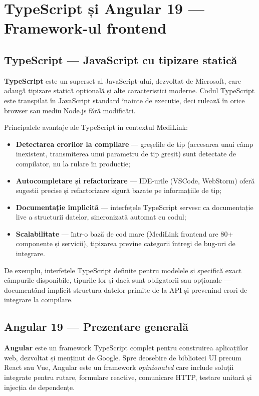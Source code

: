 \section{TypeScript și Angular 19 --- Framework-ul frontend}

\subsection{TypeScript --- JavaScript cu tipizare statică}

\textbf{TypeScript} \cite{typescript2024} este un superset al JavaScript-ului, dezvoltat de Microsoft, care adaugă tipizare statică opțională și alte caracteristici moderne. Codul TypeScript este transpilat în JavaScript standard înainte de execuție, deci rulează în orice browser sau mediu Node.js fără modificări.

Principalele avantaje ale TypeScript în contextul MediLink:

\begin{itemize}
  \item \textbf{Detectarea erorilor la compilare} --- greșelile de tip (accesarea unui câmp inexistent, transmiterea unui parametru de tip greșit) sunt detectate de compilator, nu la rulare în producție;
  \item \textbf{Autocompletare și refactorizare} --- IDE-urile (VSCode, WebStorm) oferă sugestii precise și refactorizare sigură bazate pe informațiile de tip;
  \item \textbf{Documentație implicită} --- interfețele TypeScript servesc ca documentație live a structurii datelor, sincronizată automat cu codul;
  \item \textbf{Scalabilitate} --- într-o bază de cod mare (MediLink frontend are 80+ componente și servicii), tipizarea previne categorii întregi de bug-uri de integrare.
\end{itemize}

De exemplu, interfețele TypeScript definite pentru modelele  și  specifică exact câmpurile disponibile, tipurile lor și dacă sunt obligatorii sau opționale — documentând implicit structura datelor primite de la API și prevenind erori de integrare la compilare.

\subsection{Angular 19 --- Prezentare generală}

\textbf{Angular} \cite{angular2024} este un framework TypeScript complet pentru construirea aplicațiilor web, dezvoltat și menținut de Google. Spre deosebire de biblioteci UI precum React sau Vue, Angular este un framework \textit{opinionated} care include soluții integrate pentru rutare, formulare reactive, comunicare HTTP, testare unitară și injecția de dependențe.

